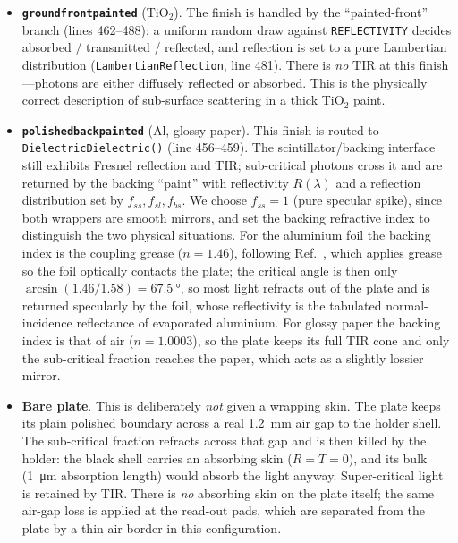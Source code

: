 \documentclass[11pt,a4paper]{article}
\begin{document}
\begin{itemize}
  \item \textbf{\texttt{groundfrontpainted}} (TiO$_2$). The finish is handled by
        the ``painted-front'' branch (lines 462--488): a uniform random draw
        against \texttt{REFLECTIVITY} decides absorbed / transmitted / reflected,
        and reflection is set to a pure Lambertian distribution
        (\texttt{LambertianReflection}, line 481). There is \emph{no} TIR at this
        finish---photons are either diffusely reflected or absorbed. This is the
        physically correct description of sub-surface scattering in a thick
        TiO$_2$ paint.
  \item \textbf{\texttt{polishedbackpainted}} (Al, glossy paper). This finish is
        routed to \texttt{DielectricDielectric()} (line 456--459). The
        scintillator/backing interface still exhibits Fresnel reflection and TIR;
        sub-critical photons cross it and are returned by the backing ``paint''
        with reflectivity $R(\lambda)$ and a reflection distribution set by
        $f_{ss}, f_{sl}, f_{bs}$. We choose $f_{ss} = 1$ (pure specular spike),
        since both wrappers are smooth mirrors, and set the backing refractive
        index to distinguish the two physical situations. For the aluminium foil
        the backing index is the coupling grease ($n = 1.46$), following
        Ref.~\cite{Rao2025}, which applies grease so the foil optically contacts
        the plate; the critical angle is then only
        $\arcsin(1.46/1.58) = \SI{67.5}{\degree}$, so most light refracts out of
        the plate and is returned specularly by the foil, whose reflectivity is
        the tabulated normal-incidence reflectance of evaporated aluminium. For
        glossy paper the backing index is that of air ($n = 1.0003$), so the
        plate keeps its full TIR cone and only the sub-critical fraction reaches
        the paper, which acts as a slightly lossier mirror.
  \item \textbf{Bare plate}. This is deliberately \emph{not} given a wrapping
        skin. The plate keeps its plain polished boundary across a real
        \SI{1.2}{\milli\meter} air gap to the holder shell. The sub-critical
        fraction refracts across that gap and is then killed by the holder: the
        black shell carries an absorbing skin ($R = T = 0$), and its bulk
        (\SI{1}{\micro\meter} absorption length) would absorb the light anyway.
        Super-critical light is retained by TIR. There is \emph{no} absorbing
        skin on the plate itself; the same air-gap loss is applied at the
        read-out pads, which are separated from the plate by a thin air border
        in this configuration.
\end{itemize}
\end{document}
